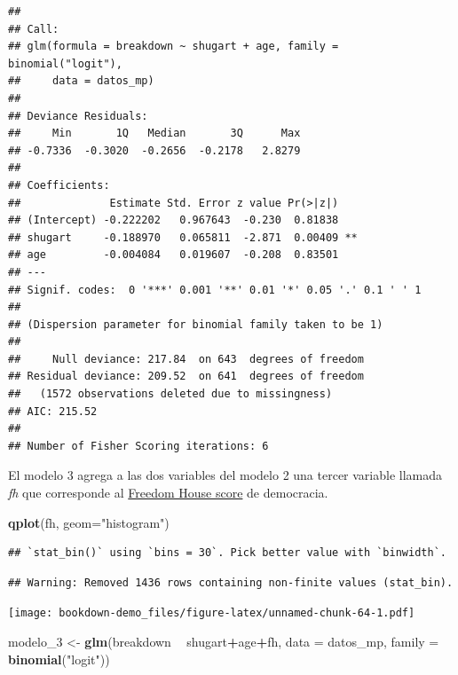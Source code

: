 \documentclass[]{book}
\newenvironment{Shaded}{\begin{snugshade}}{\end{snugshade}}
\newcommand{\KeywordTok}[1]{\textcolor[rgb]{0.13,0.29,0.53}{\textbf{#1}}}
\newcommand{\DataTypeTok}[1]{\textcolor[rgb]{0.13,0.29,0.53}{#1}}
\newcommand{\DecValTok}[1]{\textcolor[rgb]{0.00,0.00,0.81}{#1}}
\newcommand{\StringTok}[1]{\textcolor[rgb]{0.31,0.60,0.02}{#1}}
\newcommand{\OperatorTok}[1]{\textcolor[rgb]{0.81,0.36,0.00}{\textbf{#1}}}
\newcommand{\NormalTok}[1]{#1}
\begin{document}
\begin{verbatim}
## 
## Call:
## glm(formula = breakdown ~ shugart + age, family = binomial("logit"), 
##     data = datos_mp)
## 
## Deviance Residuals: 
##     Min       1Q   Median       3Q      Max  
## -0.7336  -0.3020  -0.2656  -0.2178   2.8279  
## 
## Coefficients:
##              Estimate Std. Error z value Pr(>|z|)   
## (Intercept) -0.222202   0.967643  -0.230  0.81838   
## shugart     -0.188970   0.065811  -2.871  0.00409 **
## age         -0.004084   0.019607  -0.208  0.83501   
## ---
## Signif. codes:  0 '***' 0.001 '**' 0.01 '*' 0.05 '.' 0.1 ' ' 1
## 
## (Dispersion parameter for binomial family taken to be 1)
## 
##     Null deviance: 217.84  on 643  degrees of freedom
## Residual deviance: 209.52  on 641  degrees of freedom
##   (1572 observations deleted due to missingness)
## AIC: 215.52
## 
## Number of Fisher Scoring iterations: 6
\end{verbatim}

El modelo 3 agrega a las dos variables del modelo 2 una tercer variable
llamada \emph{fh} que corresponde al
\href{https://freedomhouse.org/report/methodology-freedom-world-2017}{Freedom
House score} de democracia.

\begin{Shaded}
\begin{Highlighting}[]
\KeywordTok{qplot}\NormalTok{(fh, }\DataTypeTok{geom=}\StringTok{"histogram"}\NormalTok{) }
\end{Highlighting}
\end{Shaded}

\begin{verbatim}
## `stat_bin()` using `bins = 30`. Pick better value with `binwidth`.
\end{verbatim}

\begin{verbatim}
## Warning: Removed 1436 rows containing non-finite values (stat_bin).
\end{verbatim}

\texttt{[image: bookdown-demo\_files/figure-latex/unnamed-chunk-64-1.pdf]}

\begin{Shaded}
\begin{Highlighting}[]
\NormalTok{modelo_}\DecValTok{3}\NormalTok{ <-}\StringTok{ }\KeywordTok{glm}\NormalTok{(breakdown }\OperatorTok{~}\StringTok{ }\NormalTok{shugart}\OperatorTok{+}\NormalTok{age}\OperatorTok{+}\NormalTok{fh, }
                \DataTypeTok{data   =}\NormalTok{ datos_mp,}
                \DataTypeTok{family =} \KeywordTok{binomial}\NormalTok{(}\StringTok{"logit"}\NormalTok{))}
\end{Highlighting}
\end{Shaded}
\end{document}
